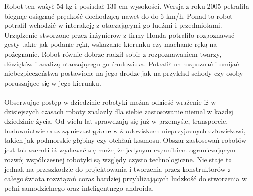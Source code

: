 Robot ten ważył 54 kg i posiadał 130 cm wysokości. Wersja z roku 2005 potrafiła
biegnąc osiągnąć prędkość dochodzącą nawet do do 6 km/h. Ponad to robot potrafił
wchodzić w interakcję z otaczającymi go ludźmi i przedmiotami. Urządzenie
stworzone przez inżynierów z firmy Honda potrafiło rozpoznawać gesty takie jak
podanie ręki, wskazanie kierunku czy machanie ręką na pożegnanie. Robot równie
dobrze radził sobie z rozpoznawaniem twarzy, dźwięków i analizą otaczającego go
środowiska. Potrafił on rozpoznać i omijać niebezpieczeństwa postawione na jego
drodze jak na przykład schody czy osoby poruszające się w jego kierunku.\\
\\
Obserwując postęp w dziedzinie robotyki można odnieść wrażenie iż w dzisiejszych
czasach roboty znalazły dla siebie zastosowanie niemal w każdej dziedzinie życia.
Od wielu lat sprawdzają się już w przemyśle, transporcie, budownictwie oraz są
niezastąpione w środowiskach nieprzyjaznych człowiekowi, takich jak podmorskie
głębiny czy otchłań kosmosu. Obszar zastosowań robotów jest tak szeroki iż
wydawać się może, że jedynym czynnikiem ograniczającym rozwój współczesnej
robotyki są względy czysto technologiczne. Nie staje to jednak na przeszkodzie do
projektowania i tworzenia przez konstruktorów z całego świata rozwiązań coraz
bardziej przybliżających ludzkość do stworzenia w pełni samodzielnego oraz
inteligentnego androida.
